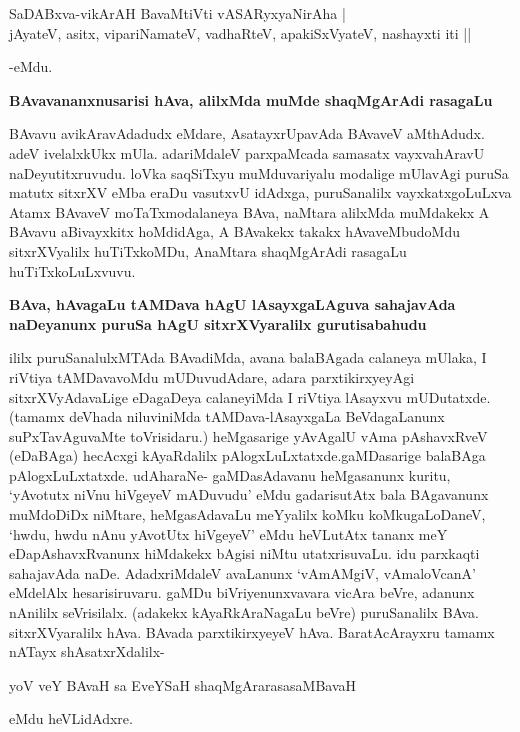 \begin{shloka}
SaDABxva-vikArAH BavaMtiVti vASARyxyaNirAha | \\
jAyateV, asitx, vipariNamateV, vadhaRteV, apakiSxVyateV, nashayxti iti || 
\end{shloka}
\noindent
-eMdu.

{\medskip
\noindent
{\large\bf BAvavananxnusarisi hAva, alilxMda muMde shaqMgArAdi rasagaLu}}\label{page226}
\medskip

\noindent
BAvavu avikAravAdadudx eMdare, AsatayxrUpavAda BAvaveV aMthAdudx. adeV ivelalxkUkx mUla. adariMdaleV parxpaMcada samasatx vayxvahAravU naDeyutitxruvudu. loVka saqSiTxyu muMduvariyalu modalige mUlavAgi puruSa matutx sitxrXV eMba eraDu vasutxvU idAdxga, puruSanalilx vayxkatxgoLuLxva Atamx BAvaveV moTaTxmodalaneya BAva, naMtara alilxMda muMdakekx A BAvavu aBivayxkitx hoMdidAga, A BAvakekx takakx hAvaveMbudoMdu sitxrXVyalilx huTiTxkoMDu, AnaMtara shaqMgArAdi rasagaLu huTiTxkoLuLxvuvu.

{\bigskip
\noindent
{\large\bf BAva, hAvagaLu tAMDava hAgU lAsayxgaLAguva sahajavAda naDeyanunx puruSa hAgU sitxrXVya\-ralilx gurutisabahudu}}\label{page226}
\medskip

\noindent
ililx puruSanalulxMTAda BAvadiMda, avana balaBAgada calaneya mUlaka, I riVtiya tAMDava\-voMdu mUDuvudAdare, adara parxtikirxyeyAgi sitxrXVyAdavaLige eDagaDeya calaneyiMda I riVtiya lAsayxvu mUDutatxde. (tamamx deVhada niluvi\-niMda tAMDava-lAsayxgaLa BeVdagaLanunx suPxTavAguvaMte toVrisidaru.) heMgasarige yAvAgalU vAma pAshavxRveV (eDaBAga) hecAcxgi kAyaRdalilx pAlogxLuLx\-tatxde.\break gaMDasarige balaBAga pAlogxLuLx\-tatxde. udAharaNe- gaMDasAdavanu heMgasanunx \hbox{kuritu}, `yAvotutx niVnu hiVgeyeV mADuvudu' eMdu gadarisutAtx bala BAga\-vanunx muMdoDiDx niMtare, heMgasAdavaLu meYyalilx koMku koMkugaLoDaneV, `hwdu, hwdu nAnu yAvotUtx hiVgeyeV' eMdu heVLutAtx tananx meY eDapAshavxRvanunx hiMdakekx bAgisi niMtu utatxrisuvaLu. idu parxkaqti sahajavAda naDe. AdadxriMdaleV avaLanunx `vAmAMgiV, vAmaloVcanA' eMdelAlx hesarisiruvaru. gaMDu biVriyenunxvavara vicAra beVre, adanunx nAnililx seVrisilalx. (adakekx kAyaR\-kAraNagaLu beVre) puruSanalilx BAva. sitxrXVyaralilx hAva. BAvada parxtikirxyeyeV hAva. BaratAcArayxru tamamx nATayx shAsatxrXdalilx-

\begin{shloka} 
yoV veY BAvaH sa EveYSaH shaqMgArarasasaMBavaH\label{227}
\end{shloka}

eMdu heVLidAdxre.

